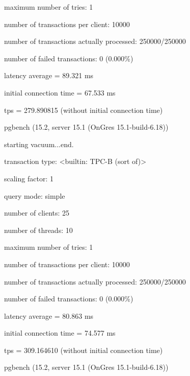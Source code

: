 maximum number of tries: 1

number of transactions per client: 10000

number of transactions actually processed: 250000/250000

number of failed transactions: 0 (0.000\%)

latency average = 89.321 ms

initial connection time = 67.533 ms

tps = 279.890815 (without initial connection time)


pgbench (15.2, server 15.1 (OnGres 15.1-build-6.18))

starting vacuum...end.

transaction type: <builtin: TPC-B (sort of)>

scaling factor: 1

query mode: simple

number of clients: 25

number of threads: 10

maximum number of tries: 1

number of transactions per client: 10000

number of transactions actually processed: 250000/250000

number of failed transactions: 0 (0.000\%)

latency average = 80.863 ms

initial connection time = 74.577 ms

tps = 309.164610 (without initial connection time)

pgbench (15.2, server 15.1 (OnGres 15.1-build-6.18))

